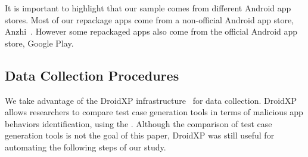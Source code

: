 










It is important to highlight that our sample comes
from different Android app stores. Most of our repackage apps come from a non-official
Android app store, Anzhi~\cite{anzhi}. However some repackaged apps also come from the
official Android app store, Google Play.




\subsection{Data Collection Procedures} \label{sec:dataCollectionProc}

We take advantage of the DroidXP infrastructure~\cite{DBLP:conf/scam/CostaMCMVBC20}
for data collection. DroidXP allows researchers to compare 
test case generation tools in terms of malicious app behaviors identification, using the \mas. Although the comparison of test
case generation tools is not the goal of this paper, DroidXP
was still useful for automating the following steps of our study.


